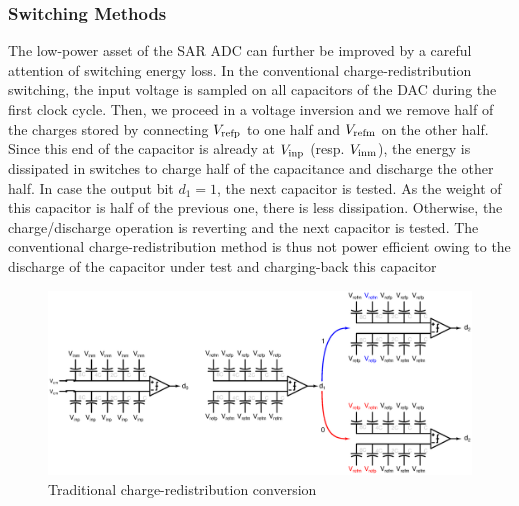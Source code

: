 \subsubsection{Switching Methods}
\label{sec:sar-switching}
The low-power asset of the SAR ADC can further be improved by a careful attention of switching energy loss. In the conventional charge-redistribution switching, the input voltage is sampled on all capacitors of the DAC during the first clock cycle. Then, we proceed in a voltage inversion and we remove half of the charges stored by connecting $V_{\rm refp}$ to one half and $V_{\rm refm}$ on the other half. Since this end of the capacitor is already at $V_{\rm inp}$ (resp. $V_{\rm inm}$), the energy is dissipated in switches to charge half of the capacitance and discharge the other half. In case the output bit $d_1 = 1$, the next capacitor is tested. As the weight of this capacitor is half of the previous one, there is less dissipation. Otherwise, the charge/discharge operation is reverting and the next capacitor is tested. The conventional charge-redistribution method is thus not power efficient owing to the discharge of the capacitor under test and charging-back this capacitor~\cite{Ginsburg2005}

\begin{figure}[htp]
	\centering
	\includegraphics[width=\textwidth]{Chapter2/Figs/Vector/conv-charge-redis.ps}
	\caption{Traditional charge-redistribution conversion}
	\label{fig:sar_vcm_monotonic}
\end{figure}

